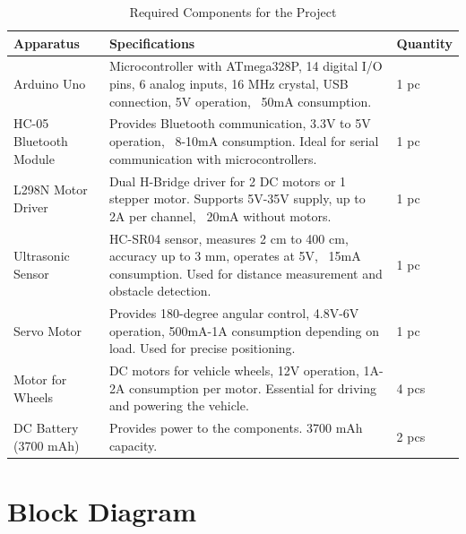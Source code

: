 \documentclass[12pt,a4paper]{report}
\begin{document}
\begin{table}[H]
\centering

\caption{Required Components for the Project}
\begin{tabular}{|p{5cm}|p{7cm}|p{2cm}|}
\hline
\textbf{Apparatus} & \textbf{Specifications} & \textbf{Quantity} \\
\hline
Arduino Uno & Microcontroller with ATmega328P, 14 digital I/O pins, 6 analog inputs, 16 MHz crystal, USB connection, 5V operation, ~50mA consumption. & 1 pc \\
\hline
HC-05 Bluetooth Module & Provides Bluetooth communication, 3.3V to 5V operation, ~8-10mA consumption. Ideal for serial communication with microcontrollers. & 1 pc \\
\hline
L298N Motor Driver & Dual H-Bridge driver for 2 DC motors or 1 stepper motor. Supports 5V-35V supply, up to 2A per channel, ~20mA without motors. & 1 pc \\
\hline
Ultrasonic Sensor & HC-SR04 sensor, measures 2 cm to 400 cm, accuracy up to 3 mm, operates at 5V, ~15mA consumption. Used for distance measurement and obstacle detection. & 1 pc \\
\hline
Servo Motor & Provides 180-degree angular control, 4.8V-6V operation, 500mA-1A consumption depending on load. Used for precise positioning. & 1 pc \\
\hline
Motor for Wheels & DC motors for vehicle wheels, 12V operation, 1A-2A consumption per motor. Essential for driving and powering the vehicle. & 4 pcs \\
\hline
DC Battery (3700 mAh) & Provides power to the components. 3700 mAh capacity. & 2 pcs \\
\hline
\end{tabular}
\end{table}

\chapter*{Block Diagram}
\end{document}
